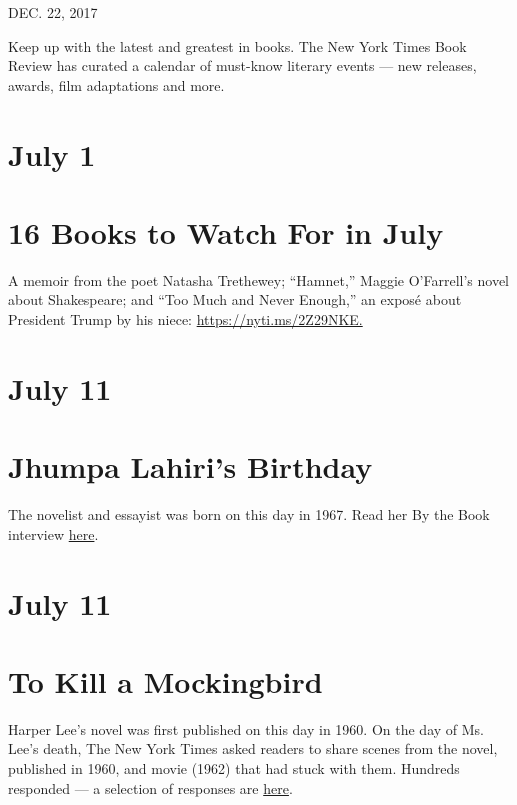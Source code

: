DEC. 22, 2017

Keep up with the latest and greatest in books. The New York Times Book
Review has curated a calendar of must-know literary events --- new
releases, awards, film adaptations and more.

\hypertarget{july-1}{%
\section{July 1}\label{july-1}}

\hypertarget{16-books-to-watch-for-in-july}{%
\section{16 Books to Watch For in
July}\label{16-books-to-watch-for-in-july}}

A memoir from the poet Natasha Trethewey; ``Hamnet,'' Maggie O'Farrell's
novel about Shakespeare; and ``Too Much and Never Enough,'' an exposé
about President Trump by his niece:
\href{https://nyti.ms/2Z29NKE?smid=bookscal}{https://nyti.ms/2Z29NKE.}

\hypertarget{july-11}{%
\section{July 11}\label{july-11}}

\hypertarget{jhumpa-lahiris-birthday}{%
\section{Jhumpa Lahiri's Birthday}\label{jhumpa-lahiris-birthday}}

The novelist and essayist was born on this day in 1967. Read her By the
Book interview \href{https://nyti.ms/37YC6xq?smid=bookscal}{here}.

\hypertarget{july-11-1}{%
\section{July 11}\label{july-11-1}}

\hypertarget{to-kill-a-mockingbird}{%
\section{To Kill a Mockingbird}\label{to-kill-a-mockingbird}}

Harper Lee's novel was first published on this day in 1960. On the day
of Ms. Lee's death, The New York Times asked readers to share scenes
from the novel, published in 1960, and movie (1962) that had stuck with
them. Hundreds responded --- a selection of responses are
\href{https://nyti.ms/37YK5up?smid=bookscal}{here}.

